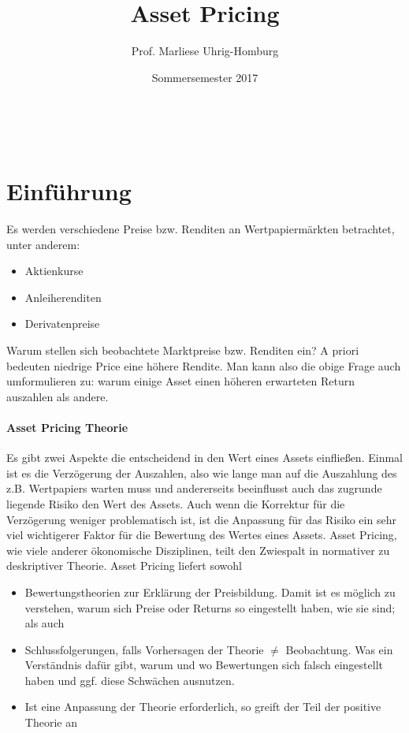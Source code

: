 \documentclass[12pt]{extreport} %
\title{Asset Pricing}
\author{Prof. Marliese Uhrig-Homburg}
\date{Sommersemester 2017}
\makeatletter
\theoremstyle{named}
\theoremstyle{nnamed}
\theoremstyle{itshape}
\theoremstyle{normal}
\def\maketitle{ \begin{titlepage} 
			~\vspace{3cm} 
		\begin{center} {\Huge \@title} \end{center} 
	 		\vspace*{1cm} 
	 	\begin{center} {\large \@author} \end{center} 
	 	\vspace*{-0.5cm}
	 	\begin{center} \@date \end{center} 
	 		\vspace*{7cm} 
	 	\begin{center} \@publishers \end{center} 
	 		\vfill 
	\end{titlepage} }
\makeatother
\begin{document}
\begin{titlepage}
	\maketitle
	\thispagestyle{empty}
\end{titlepage}

\tableofcontents
\thispagestyle{empty}


\chapter{Einführung}

Es werden verschiedene Preise bzw. Renditen an Wertpapiermärkten betrachtet, unter anderem:

\begin{itemize}
	\item Aktienkurse
	\item Anleiherenditen
	\item Derivatenpreise
\end{itemize}

Warum stellen sich beobachtete Marktpreise bzw. Renditen ein? A priori bedeuten niedrige Price eine höhere Rendite. Man kann also die obige Frage auch umformulieren zu: warum einige Asset einen höheren erwarteten Return auszahlen als andere.

\subsubsection{Asset Pricing Theorie}
Es gibt zwei Aspekte die entscheidend in den Wert eines Assets einfließen. Einmal ist es die Verzögerung der Auszahlen, also wie lange man auf die Auszahlung des z.B. Wertpapiers warten muss und andererseits beeinflusst auch das zugrunde liegende Risiko den Wert des Assets. Auch wenn die Korrektur für die Verzögerung weniger problematisch ist, ist die Anpassung für das Risiko ein sehr viel wichtigerer Faktor für die Bewertung des Wertes eines Assets. Asset Pricing, wie viele anderer ökonomische Disziplinen, teilt den Zwiespalt in normativer zu deskriptiver Theorie. Asset Pricing liefert sowohl
\begin{itemize}
	\item Bewertungstheorien zur Erklärung der Preisbildung. Damit ist es möglich zu verstehen, warum sich Preise oder Returns so eingestellt haben, wie sie sind; als auch
	\item Schlussfolgerungen, falls Vorhersagen der Theorie $\neq$ Beobachtung. Was ein Verständnis dafür gibt, warum und wo Bewertungen sich falsch eingestellt haben und ggf. diese Schwächen ausnutzen.
	\item Ist eine Anpassung der Theorie erforderlich, so greift der Teil der positive Theorie an
\end{itemize}
\end{document}
